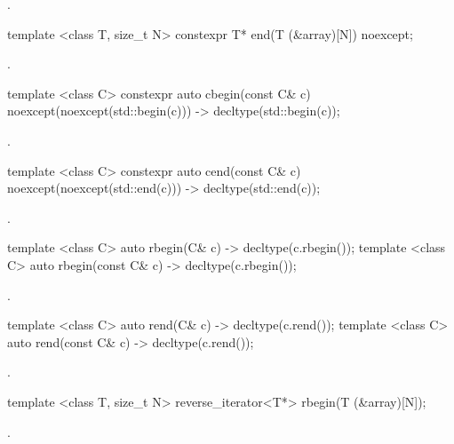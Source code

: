 \begin{itemdescr}
\pnum
\returns {}.
\end{itemdescr}

%
\begin{itemdecl}
template <class T, size_t N> constexpr T* end(T (&array)[N]) noexcept;
\end{itemdecl}

\begin{itemdescr}
\pnum
\returns {}.
\end{itemdescr}

%
\begin{itemdecl}
template <class C> constexpr auto cbegin(const C& c) noexcept(noexcept(std::begin(c)))
  -> decltype(std::begin(c));
\end{itemdecl}
\begin{itemdescr}
\pnum \returns {}.
\end{itemdescr}

%
\begin{itemdecl}
template <class C> constexpr auto cend(const C& c) noexcept(noexcept(std::end(c)))
  -> decltype(std::end(c));
\end{itemdecl}
\begin{itemdescr}
\pnum \returns {}.
\end{itemdescr}

%
\begin{itemdecl}
template <class C> auto rbegin(C& c) -> decltype(c.rbegin());
template <class C> auto rbegin(const C& c) -> decltype(c.rbegin());
\end{itemdecl}
\begin{itemdescr}
\pnum \returns {}.
\end{itemdescr}

%
\begin{itemdecl}
template <class C> auto rend(C& c) -> decltype(c.rend());
template <class C> auto rend(const C& c) -> decltype(c.rend());
\end{itemdecl}
\begin{itemdescr}
\pnum \returns {}.
\end{itemdescr}

%
\begin{itemdecl}
template <class T, size_t N> reverse_iterator<T*> rbegin(T (&array)[N]);
\end{itemdecl}
\begin{itemdescr}
\pnum \returns {}.
\end{itemdescr}

